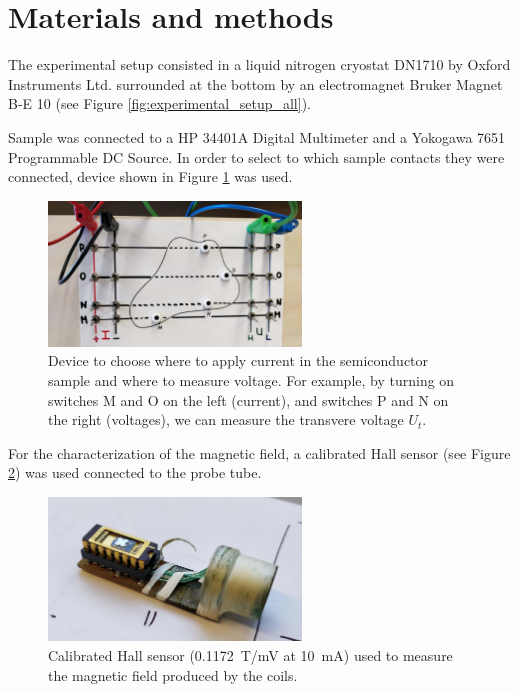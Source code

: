 \documentclass[11pt,a4paper]{article}
\begin{document}
\section{Materials and methods}

The experimental setup consisted in a liquid nitrogen cryostat DN1710 by Oxford Instruments Ltd. surrounded at the bottom by an electromagnet Bruker Magnet B-E 10 (see Figure \ref{fig:experimental_setup_all}).

Sample was connected to a HP 34401A Digital Multimeter and a Yokogawa 7651 Programmable DC Source. In order to select to which sample contacts they were connected, device shown in Figure \ref{fig:cables} was used.

\begin{figure}[H]
\centering
\includegraphics[width=0.6\textwidth]{Experimental_setup_cables}
\caption{Device to choose where to apply current in the semiconductor sample and where to measure voltage. For example, by turning on switches M and O on the left (current), and switches P and N on the right (voltages), we can measure the transvere voltage $U_t$.}
\label{fig:cables}
\end{figure}

For the characterization of the magnetic field, a calibrated Hall sensor (see Figure \ref{fig:Hall_sensor}) was used connected to the probe tube.

\begin{figure}[H]
\centering
\includegraphics[width=0.6\textwidth]{Hall_sensor}
\caption{Calibrated Hall sensor (\SI{0.1172}{\tesla/\milli\volt} at \SI{10}{\milli\ampere}) used to measure the magnetic field produced by the coils.}
\label{fig:Hall_sensor}
\end{figure}
\end{document}
